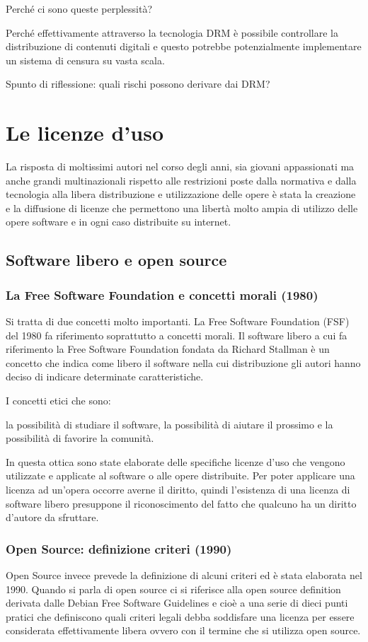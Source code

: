 Perché ci sono queste perplessità? 

Perché effettivamente attraverso la tecnologia DRM è possibile controllare la distribuzione di contenuti digitali e questo potrebbe potenzialmente implementare un sistema di censura su vasta scala. 

Spunto di riflessione: quali rischi possono derivare dai DRM? 


\section{Le licenze d'uso}

La risposta di moltissimi autori nel corso degli anni, sia giovani appassionati ma anche grandi multinazionali rispetto alle restrizioni poste dalla normativa e dalla tecnologia alla libera distribuzione e utilizzazione delle opere è stata la creazione e la diffusione di licenze che permettono una libertà molto ampia di utilizzo delle opere software e in ogni caso distribuite su internet.

\subsection{Software libero e open source}
\subsubsection{La Free Software Foundation e concetti morali (1980)}
Si tratta di due concetti molto importanti. La Free Software Foundation (FSF) del 1980 fa riferimento soprattutto a concetti morali. 
Il software libero a cui fa riferimento la Free Software Foundation fondata da Richard Stallman è un concetto che indica come libero il software nella cui distribuzione gli autori hanno deciso di indicare determinate caratteristiche. 

I concetti etici che sono:

la possibilità di studiare il software, 
la possibilità di aiutare il prossimo e 
la possibilità di favorire la comunità. 

In questa ottica sono state elaborate delle specifiche licenze d'uso che vengono utilizzate e applicate al software o alle opere distribuite. 
Per poter applicare una licenza ad un'opera occorre averne il diritto, quindi l'esistenza di una licenza di software libero presuppone il riconoscimento del fatto che qualcuno ha un diritto d'autore da sfruttare.

\subsubsection{Open Source: definizione criteri (1990)}
Open Source invece prevede la definizione di alcuni criteri ed è stata elaborata nel 1990. Quando si parla di open source ci si riferisce alla open source definition derivata dalle Debian Free Software Guidelines e cioè a una serie di dieci punti pratici che definiscono quali criteri legali debba soddisfare una licenza per essere considerata effettivamente libera ovvero con il termine che si utilizza open source. 

